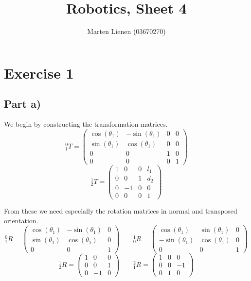 \documentclass[10pt,a4paper]{article}
\title{Robotics, Sheet 4}
\author{Marten Lienen (03670270)}
\begin{document}
\maketitle

\section*{Exercise 1}

\subsection*{Part a)}

We begin by constructing the transformation matrices.
\begin{equation*}
  {}_{1}^{0}T = \begin{pmatrix}
    \cos(\theta_{1}) & -\sin(\theta_{1}) & 0 & 0\\
    \sin(\theta_{1}) & \cos(\theta_{1}) & 0 & 0\\
    0 & 0 & 1 & 0\\
    0 & 0 & 0 & 1
  \end{pmatrix}
\end{equation*}
\begin{equation*}
  {}_{2}^{1}T = \begin{pmatrix}
    1 & 0 & 0 & l_{1}\\
    0 & 0 & 1 & d_{2}\\
    0 & -1 & 0 & 0\\
    0 & 0 & 0 & 1
  \end{pmatrix}
\end{equation*}

From these we need especially the rotation matrices in normal and transposed orientation.
\begin{equation*}
  {}_{1}^{0}R = \begin{pmatrix}
    \cos(\theta_{1}) & -\sin(\theta_{1}) & 0\\
    \sin(\theta_{1}) & \cos(\theta_{1}) & 0\\
    0 & 0 & 1
  \end{pmatrix}
  \qquad
  {}_{0}^{1}R = \begin{pmatrix}
    \cos(\theta_{1}) & \sin(\theta_{1}) & 0\\
    -\sin(\theta_{1}) & \cos(\theta_{1}) & 0\\
    0 & 0 & 1
  \end{pmatrix}
\end{equation*}
\begin{equation*}
  {}_{2}^{1}R = \begin{pmatrix}
    1 & 0 & 0\\
    0 & 0 & 1\\
    0 & -1 & 0
  \end{pmatrix}
  \qquad
  {}_{1}^{2}R = \begin{pmatrix}
    1 & 0 & 0\\
    0 & 0 & -1\\
    0 & 1 & 0
  \end{pmatrix}
\end{equation*}
\end{document}
